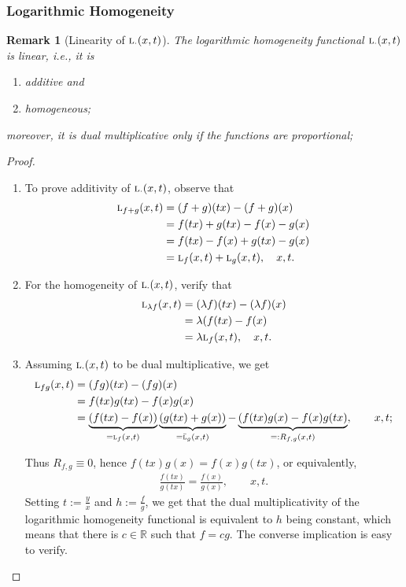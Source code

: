 \documentclass{amsart}
\makeatletter
\theoremstyle{plain}
\newtheorem{remark}{Remark}
\numberwithin{equation}{section}
\def\lambda{\Greekmath 0115 }%
\def\FindBoldGroup{%
   {\setbox0=\hbox{$\mathbf{x\global\edef\theboldgroup{\the\mathgroup}}$}}%
}
\def\Greekmath#1#2#3#4{%
    \if@compatibility
        \ifnum\mathgroup=\symbold
           \mathchoice{\mbox{\boldmath$\displaystyle\mathchar"#1#2#3#4$}}%
                      {\mbox{\boldmath$\textstyle\mathchar"#1#2#3#4$}}%
                      {\mbox{\boldmath$\scriptstyle\mathchar"#1#2#3#4$}}%
                      {\mbox{\boldmath$\scriptscriptstyle\mathchar"#1#2#3#4$}}%
        \else
           \mathchar"#1#2#3#4%
        \fi 
    \else 
        \FindBoldGroup
        \ifnum\mathgroup=\theboldgroup %
           \mathchoice{\mbox{\boldmath$\displaystyle\mathchar"#1#2#3#4$}}%
                      {\mbox{\boldmath$\textstyle\mathchar"#1#2#3#4$}}%
                      {\mbox{\boldmath$\scriptstyle\mathchar"#1#2#3#4$}}%
                      {\mbox{\boldmath$\scriptscriptstyle\mathchar"#1#2#3#4$}}%
        \else
           \mathchar"#1#2#3#4%
        \fi     	    
	  \fi}
\newcommand{\lh}{\textsc{l}}
\newcommand{\dlh}{\bar{\textsc{l}}}
\newcommand{\R}{{\mathbb{R}}}
\makeatother
\begin{document}
\subsubsection{Logarithmic Homogeneity}
\begin{remark}[Linearity of $\lh_{\cdot}(x,t)$]
The logarithmic homogeneity functional $\lh_{\cdot}(x,t)$  is linear, i.e., it is
\begin{enumerate}
    \item 
additive and
 \item 
homogeneous;
\end{enumerate}
\item 
moreover, it is dual multiplicative only if the functions are proportional;  
\end{remark}

\begin{proof}
\begin{enumerate}
    \item 
To prove additivity of $\lh_{\cdot}(x,t)$, observe that
\begin{align*}
\lh_{f+g}(x,t) &= (f+g)(tx)-(f+g)(x)\\
&=
f(tx)+g(tx)-f(x)-g(x)\\
&=f(tx)-f(x)+g(tx)-g(x)\\
&= \lh_{f}(x,t) + \lh_{g}(x,t), \quad x,t.
\end{align*}
 \item 
For the homogeneity of $\lh_{\cdot}(x,t)$, verify that
\begin{align*}
\lh_{\lambda f}(x,t) &= (\lambda f)(tx)-(\lambda f)(x)\\
&=
 \lambda ( f(tx) - f(x)\\
 &=
\lambda \lh_{f}(x,t), \quad x,t.
\end{align*}

\item 
Assuming $\lh_{\cdot}(x,t)$ to be dual multiplicative, we get
\begin{align*}
\lh_{fg}(x,t) &= (fg)(tx)-(fg)(x)\\
&=
 f(tx) g(tx)-f(x) g(x)\\
&=
\underbrace{ (f(tx) - f(x)) }_{ = \lh_f(x,t) } 
\underbrace{ (g(tx) + g(x))}_{ = \dlh_g (x,t)} - \underbrace{( f(tx) g(x) - f(x) g(tx)}_{=:R_{f,g} (x,t)}, \qquad x,t;
\end{align*} 

Thus $R_{f,g} \equiv 0$, hence  $f(tx) g(x) = f(x) g(tx)$, 
or equivalently,
\begin{align*}
\frac{f(tx)}{g(tx)}= \frac{f(x)}{g(x)}, \qquad x,t.
\end{align*}
Setting $t:=\frac{y}{x}$ and $h:=\frac{f}{g}$, we get that the dual multiplicativity of the logarithmic homogeneity functional is equivalent to 
$h$ being constant, which means that there is $c \in \R$ such that $f=c g$.
The converse implication is easy to verify.
\end{enumerate}

\end{proof}
 
\end{document}
